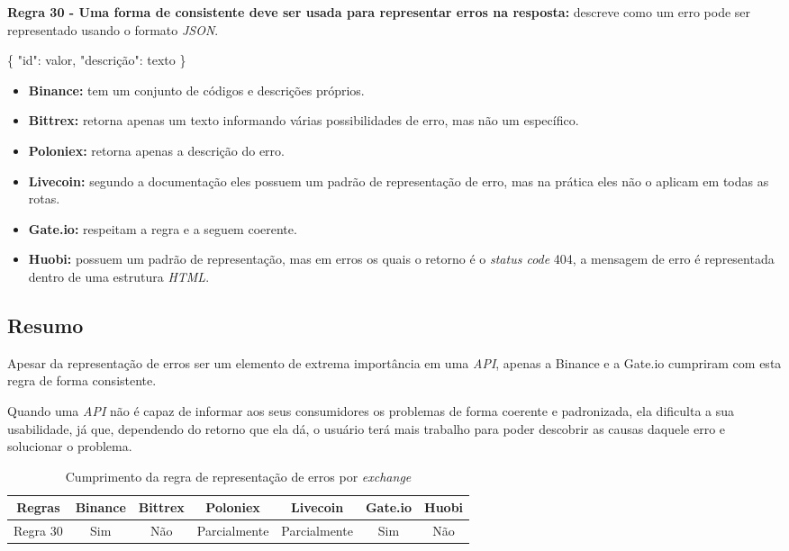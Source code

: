 \textbf{Regra 30 - Uma forma de consistente deve ser usada para representar erros na resposta:} descreve como um erro pode ser representado usando o formato \textit{JSON}.

\{ "id": valor, "descrição": texto \}

\begin{itemize}
    \item \textbf{Binance:} tem um conjunto de códigos e descrições próprios.
    \item \textbf{Bittrex:} retorna apenas um texto informando várias possibilidades de erro, mas não um específico.
    \item \textbf{Poloniex:} retorna apenas a descrição do erro.
    \item \textbf{Livecoin:} segundo a documentação eles possuem um padrão de representação de erro, mas na prática eles não o aplicam em todas as rotas.
    \item \textbf{Gate.io:} respeitam a regra e a seguem coerente.
    \item \textbf{Huobi:} possuem um padrão de representação, mas em erros os quais o retorno é o \textit{status code} 404, a mensagem de erro é representada dentro de uma estrutura \textit{HTML}.
\end{itemize}

\subsection{Resumo}
Apesar da representação de erros ser um elemento de extrema importância em uma \textit{API}, apenas a Binance e a Gate.io cumpriram com esta regra de forma consistente.

Quando uma \textit{API} não é capaz de informar aos seus consumidores os problemas de forma coerente e padronizada, ela dificulta a sua usabilidade, já que, dependendo do retorno que ela dá, o usuário terá mais trabalho para poder descobrir as causas daquele erro e solucionar o problema.

\begin{table}[h]
    \centering
    \begin{tabular}{|c|c|c|c|c|c|c|}
        \hline
        \textbf{Regras} & \textbf{Binance} & \textbf{Bittrex} & \textbf{Poloniex} & \textbf{Livecoin} & \textbf{Gate.io} & \textbf{Huobi} \\ \hline
        Regra 30        & Sim                & Não                & Parcialmente              & Parcialmente              & Sim                & Não        \\ \hline
    \end{tabular}
    \caption{Cumprimento da regra de representação de erros por \textit{exchange}}
    \label{tab:table-6}
\end{table}


